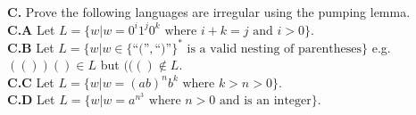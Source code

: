 \documentclass[10pt]{article}
\begin{document}
\newpage

\noindent
\textbf{C.} Prove the following languages are irregular using the pumping lemma.\\
\textbf{C.A} Let $L=\{w|w=0^i1^j0^k \text{ where } i+k=j \text{ and }i>0\}.$\\
\textbf{C.B} Let $L=\{w|w\in\{\text{``(''}, \text{``)''}\}^* \text{ is a valid nesting of parentheses}\}$ e.g. $(())()\in L$ but $((()\notin L.$\\
\textbf{C.C} Let $L=\{w|w=(ab)^nb^k \text{ where }k>n>0\}$.\\
\textbf{C.D} Let $L=\{w|w=a^{n^3} \text{ where }n>0 \text{ and is an integer}\}$.\\





\end{document}
